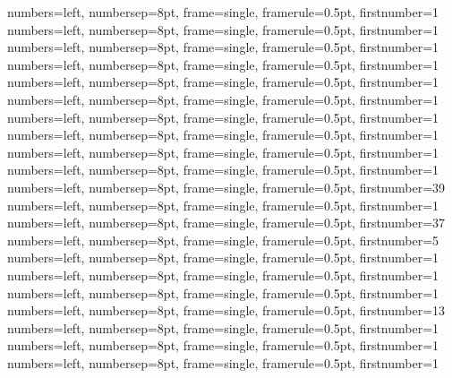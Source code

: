 {numbers=left, numbersep=8pt, frame=single, framerule=0.5pt, firstnumber=1}
{numbers=left, numbersep=8pt, frame=single, framerule=0.5pt, firstnumber=1}
{numbers=left, numbersep=8pt, frame=single, framerule=0.5pt, firstnumber=1}
{numbers=left, numbersep=8pt, frame=single, framerule=0.5pt, firstnumber=1}
{numbers=left, numbersep=8pt, frame=single, framerule=0.5pt, firstnumber=1}
{numbers=left, numbersep=8pt, frame=single, framerule=0.5pt, firstnumber=1}
{numbers=left, numbersep=8pt, frame=single, framerule=0.5pt, firstnumber=1}
{numbers=left, numbersep=8pt, frame=single, framerule=0.5pt, firstnumber=1}
{numbers=left, numbersep=8pt, frame=single, framerule=0.5pt, firstnumber=1}
{numbers=left, numbersep=8pt, frame=single, framerule=0.5pt, firstnumber=1}
{numbers=left, numbersep=8pt, frame=single, framerule=0.5pt, firstnumber=39}
{numbers=left, numbersep=8pt, frame=single, framerule=0.5pt, firstnumber=1}
{numbers=left, numbersep=8pt, frame=single, framerule=0.5pt, firstnumber=37}
{numbers=left, numbersep=8pt, frame=single, framerule=0.5pt, firstnumber=5}
{numbers=left, numbersep=8pt, frame=single, framerule=0.5pt, firstnumber=1}
{numbers=left, numbersep=8pt, frame=single, framerule=0.5pt, firstnumber=1}
{numbers=left, numbersep=8pt, frame=single, framerule=0.5pt, firstnumber=1}
{numbers=left, numbersep=8pt, frame=single, framerule=0.5pt, firstnumber=13}
{numbers=left, numbersep=8pt, frame=single, framerule=0.5pt, firstnumber=1}
{numbers=left, numbersep=8pt, frame=single, framerule=0.5pt, firstnumber=1}
{numbers=left, numbersep=8pt, frame=single, framerule=0.5pt, firstnumber=1}